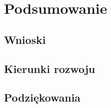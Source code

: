 \section{Podsumowanie}

\subsection{Wnioski}

\subsection{Kierunki rozwoju}

\subsection{Podziękowania}



